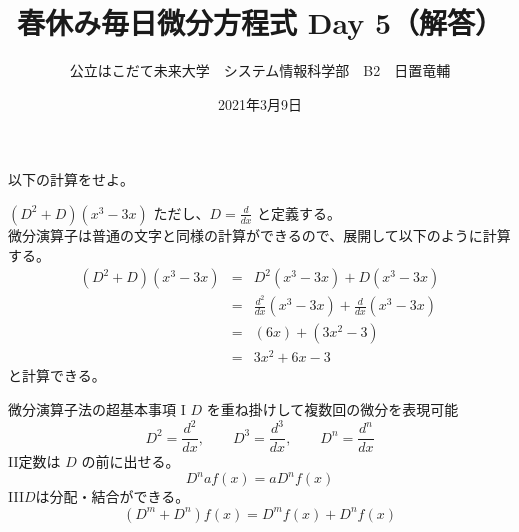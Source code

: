 \documentclass[dvipdfmx,uplatex]{jsarticle}
\title{春休み毎日微分方程式 Day 5（解答）}
\author{公立はこだて未来大学　システム情報科学部　B2　日置竜輔}
\date{2021年3月9日}
\begin{document}
\begin{spacing}{1.6}
\maketitle

以下の計算をせよ。
\begin{qparts}
    \qpart $ \displaystyle (D ^ 2 + D)(x ^ 3 - 3x) $ \quad ただし、$ \displaystyle D = \frac{d}{dx} $ と定義する。\\
    微分演算子は普通の文字と同様の計算ができるので、展開して以下のように計算する。 \\
    \begin{eqnarray*}
      (D ^ 2 + D)(x ^ 3 - 3x) & = & D ^ 2 (x ^ 3 - 3x) + D (x ^ 3 - 3x)\\
      & = & \frac{d^2}{dx}(x ^ 3 - 3x) + \frac{d}{dx}(x ^ 3 - 3x)\\
      & = & (6x) + (3x ^ 2 - 3)\\
      & = & 3x ^ 2  + 6x - 3
    \end{eqnarray*}
    と計算できる。\\
    \begin{itembox}{微分演算子法の超基本事項}
      {\rm I} \quad $ D $ を重ね掛けして複数回の微分を表現可能 \\
      \begin{equation*}
        D^2 = \frac{d^2}{dx},\qquad D^3 = \frac{d ^ 3}{dx}, \qquad D ^ n = \frac{d^n}{dx}
      \end{equation*}
      {\rm II}\quad 定数は $ D $ の前に出せる。\\
      \begin{equation*}
        D^naf(x) = aD^nf(x)
      \end{equation*}
      {\rm III}\quad $ D $は分配・結合ができる。\\
      \begin{equation*}
        (D ^ m + D ^ n)f(x) = D^mf(x) + D^nf(x)
      \end{equation*}
    \end{itembox}
\end{qparts}
\end{spacing}
\end{document}
